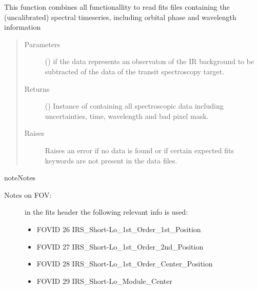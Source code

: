 \documentclass[a4paper,10pt,english]{sphinxmanual}
\begin{document}
\begin{fulllineitems}
\begin{fulllineitems}
\label{\detokenize{cascade.instruments:cascade.instruments.instruments.SpitzerIRS.get_spectral_images}}
This function combines all functionallity to read fits files
containing the (uncalibrated) spectral timeseries, including
orbital phase and wavelength information
\begin{quote}\begin{description}
\item[{Parameters}] \leavevmode
{} () \textendash{} if  the data represents an observaton of the IR background
to be subtracted of the data of the transit spectroscopy target.

\item[{Returns}] \leavevmode
{} () \textendash{} Instance of  containing all spectroscopic
data including uncertainties, time, wavelength and bad pixel mask.

\item[{Raises}] \leavevmode
{} \textendash{} Raises an error if no data is found or if certain expected
fits keywords are not present in the data files.

\end{description}\end{quote}

\begin{sphinxadmonition}{note}{Notes}
\begin{description}
\item[{Notes on FOV:}] \leavevmode
in the fits header the following relevant info is used:
\begin{itemize}
\item {} 
FOVID     26     IRS\_Short-Lo\_1st\_Order\_1st\_Position

\item {} 
FOVID     27     IRS\_Short-Lo\_1st\_Order\_2nd\_Position

\item {} 
FOVID     28     IRS\_Short-Lo\_1st\_Order\_Center\_Position

\item {} 
FOVID     29     IRS\_Short-Lo\_Module\_Center


\end{itemize}
\end{description}
\end{sphinxadmonition}
\end{fulllineitems}
\end{fulllineitems}
\end{document}
